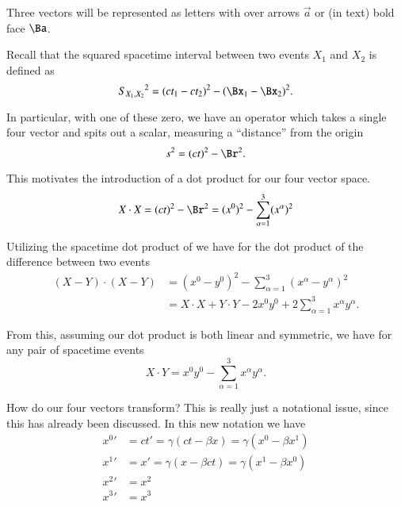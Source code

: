 Three vectors will be represented as letters with over arrows \(\vec{a}\) or (in text) bold face \(\Ba\).

Recall that the squared spacetime interval between two events \(X_1\) and \(X_2\) is defined as
%
\begin{equation}\label{eqn:relativisticElectrodynamicsT1:60}
{S_{X_1, X_2}}^2 = (ct_1 - c t_2)^2 - (\Bx_1 - \Bx_2)^2.
\end{equation}

In particular, with one of these zero, we have an operator which takes a single four vector and spits out a scalar, measuring a ``distance'' from the origin
%
\begin{equation}\label{eqn:relativisticElectrodynamicsT1:30}
s^2 = (ct)^2 - \Br^2.
\end{equation}

This motivates the introduction of a dot product for our four vector space.
%
\begin{equation}\label{eqn:relativisticElectrodynamicsT1:50}
X \cdot X = (ct)^2 - \Br^2 = (x^0)^2 - \sum_{\alpha=1}^3 (x^\alpha)^2
\end{equation}

Utilizing the spacetime dot product of  we have for the dot product of the difference between two events
%
\begin{equation}\label{eqn:relativisticElectrodynamicsT1a:140}
\begin{aligned}
(X - Y) \cdot (X - Y)
&=
(x^0 - y^0)^2 - \sum_{\alpha =1}^3 (x^\alpha - y^\alpha)^2 \\
&=
X \cdot X + Y \cdot Y - 2 x^0 y^0 + 2 \sum_{\alpha =1}^3 x^\alpha y^\alpha.
\end{aligned}
\end{equation}

From this, assuming our dot product  is both linear and symmetric, we have for any pair of spacetime events
%
\begin{equation}\label{eqn:relativisticElectrodynamicsT1:55}
X \cdot Y = x^0 y^0 - \sum_{\alpha =1}^3 x^\alpha y^\alpha.
\end{equation}

How do our four vectors transform?  This is really just a notational issue, since this has already been discussed.  In this new notation we have
%
\begin{equation}\label{eqn:relativisticElectrodynamicsT1:90}
\begin{aligned}
{x^0}' &= ct' = \gamma ( ct - \beta x) = \gamma ( x^0 - \beta x^1 ) \\
{x^1}' &= x' = \gamma ( x - \beta ct ) = \gamma ( x^1 - \beta x^0 ) \\
{x^2}' &= x^2 \\
{x^3}' &= x^3
\end{aligned}
\end{equation}

